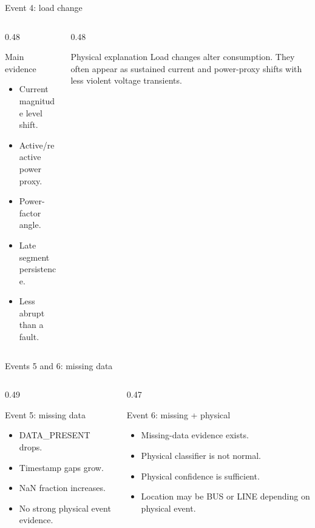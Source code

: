 \documentclass[10pt,aspectratio=169]{beamer}
\begin{document}
\begin{frame}{Event 4: load change}
\small
\begin{columns}[T,totalwidth=\textwidth]
\begin{column}{0.48\textwidth}
\begin{block}{Main evidence}
\begin{itemize}
  \item Current magnitude level shift.
  \item Active/reactive power proxy.
  \item Power-factor angle.
  \item Late segment persistence.
  \item Less abrupt than a fault.
\end{itemize}
\end{block}
\end{column}
\begin{column}{0.48\textwidth}
\begin{exampleblock}{Physical explanation}
Load changes alter consumption. They often appear as sustained current and power-proxy shifts with less violent voltage transients.
\end{exampleblock}
\end{column}
\end{columns}
\end{frame}

\begin{frame}{Events 5 and 6: missing data}
\small
\begin{columns}[T,totalwidth=\textwidth]
\begin{column}{0.49\textwidth}
\begin{block}{Event 5: missing data}
\begin{itemize}
  \item DATA\_PRESENT drops.
  \item Timestamp gaps grow.
  \item NaN fraction increases.
  \item No strong physical event evidence.
\end{itemize}
\end{block}
\end{column}
\begin{column}{0.47\textwidth}
\begin{alertblock}{Event 6: missing + physical}
\begin{itemize}
  \item Missing-data evidence exists.
  \item Physical classifier is not normal.
  \item Physical confidence is sufficient.
  \item Location may be BUS or LINE depending on physical event.
\end{itemize}
\end{alertblock}
\end{column}
\end{columns}
\end{frame}
\end{document}
